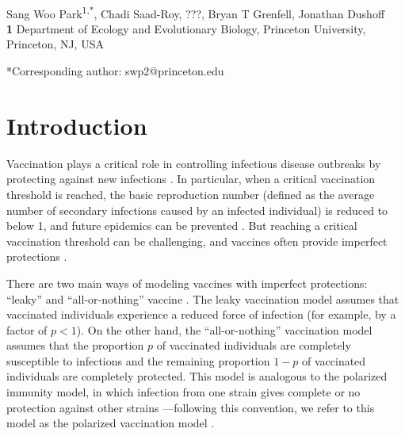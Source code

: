 \documentclass[12pt]{article}
\date{\today}
\begin{document}
\begin{flushleft}{
	\Large
	\textbf{}
}
\newline
\\
Sang Woo Park\textsuperscript{1,*}, Chadi Saad-Roy, ???, Bryan T Grenfell, Jonathan Dushoff
\\
\bigskip
\textbf{1} Department of Ecology and Evolutionary Biology, Princeton University, Princeton, NJ, USA
\\
\bigskip

*Corresponding author: swp2@princeton.edu
\end{flushleft}

\section*{Introduction}

Vaccination plays a critical role in controlling infectious disease outbreaks by protecting against new infections \citep{iwasaki2020and}.
In particular, when a critical vaccination threshold is reached, the basic reproduction number (defined as the average number of secondary infections caused by an infected individual) is reduced to below 1, and future epidemics can be prevented \citep{anderson1985vaccination}.
But reaching a critical vaccination threshold can be challenging, and vaccines often provide imperfect protections \citep{gandon2003imperfect,anderson2020challenges}.

There are two main ways of modeling vaccines with imperfect protections: ``leaky'' and ``all-or-nothing'' vaccine \citep{smith1984assessment}.
The leaky vaccination model assumes that vaccinated individuals experience a reduced force of infection (for example, by a factor of $p < 1$).
On the other hand, the ``all-or-nothing'' vaccination model assumes that the proportion $p$ of vaccinated individuals are completely susceptible to infections and the remaining proportion $1-p$ of vaccinated individuals are completely protected.
This model is analogous to the polarized immunity model, in which infection from one strain gives complete or no protection against other strains \citep{gog2002dynamics}---following this convention, we refer to this model as the polarized vaccination model \citep{gomes2014missing}.
\end{document}
